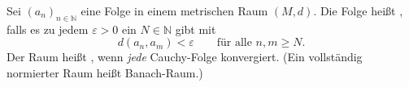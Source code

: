 Sei $(a_n)_{n \in \mathbb{N}}$ eine Folge in einem metrischen Raum $(M, d)$. Die Folge heißt , falls es zu jedem $\varepsilon > 0$ ein $N \in \mathbb{N}$ gibt mit 
$$d(a_n, a_m) < \varepsilon \qquad \text{für alle $n, m \geq N$.}$$
Der Raum heißt , wenn \textit{jede} Cauchy-Folge konvergiert. (Ein vollständig normierter Raum heißt Banach-Raum.)